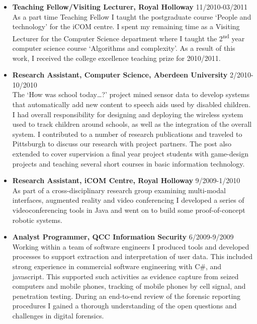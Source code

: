 \documentclass[10pt]{article}
\newenvironment{outerlist}[1][\enskip\textbullet]%
        {\begin{itemize}[#1]}{\end{itemize}%
         \vspace{-.6\baselineskip}}
\begin{document}
\begin{outerlist}
\item[] {\bf Teaching Fellow/Visiting Lecturer, Royal Holloway} \hfill 11/2010-03/2011 \\
As a part time Teaching Fellow  I taught the postgraduate course `People and technology' for the iCOM centre.  I spent my remaining time as a Visiting Lecturer for the Computer Science department where I taught the 2\textsuperscript{nd} year computer science course `Algorithms and complexity'. As a result of this work, I received the college excellence teaching prize for 2010/2011. 

\item[] {\bf Research Assistant, Computer Science, Aberdeen University} \hfill {2/2010-10/2010}\\
    The `How was school today\ldots?' project  mined sensor data to develop systems that automatically add new content to speech aids used by disabled children. I had overall responsibility for designing and deploying the wireless system used to track children around schools, as well as the integration of the overall system.  I contributed to a number of research publications and traveled to Pittsburgh to discuss our research with project partners. The post also extended to cover supervision a final year project students with game-design projects and teaching several short courses in basic information technology. 
    

\item[] {\bf Research Assistant, iCOM Centre, Royal Holloway}
\hfill 9/2009-1/2010\\
As part of a cross-disciplinary research group examining multi-modal interfaces, augmented reality and video conferencing I developed a series of  videoconferencing tools in Java and went on to build  some proof-of-concept robotic systems.  

\item[] {\bf Analyst Programmer, QCC Information Security} \hfill {6/2009-9/2009}\\
Working within a team of software engineers I produced tools and developed processes to support extraction and interpretation of user data. This included strong experience in commercial software engineering with C\#,  and javascript.  This supported such activities as evidence capture from seized computers and mobile phones, tracking of mobile phones by cell signal, and penetration testing.  During an end-to-end review of the forensic reporting procedures I gained a thorough understanding of the open questions and challenges in digital forensics.  


\end{outerlist}
\end{document}
